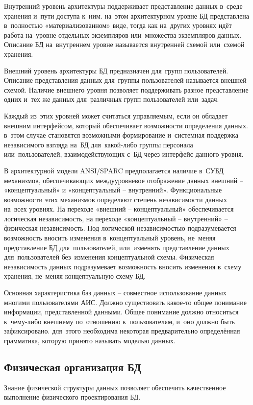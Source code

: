 \documentclass{ou}
\begin{document}
Внутренний уровень архитектуры поддерживает представление данных в~среде хранения и~пути доступа к~ним. на~этом архитектурном уровне БД представлена в~полностью «материализованном» виде, тогда как на~других уровнях идёт работа на~уровне отдельных экземпляров или~множества экземпляров данных. Описание БД на~внутреннем уровне называется внутренней схемой или~схемой хранения.

Внешний уровень архитектуры БД предназначен для~групп пользователей. Описание представления данных для~группы пользователей называется внешней схемой. Наличие внешнего уровня позволяет поддерживать разное представление одних и~тех же данных для~различных групп пользователей или~задач.

Каждый из~этих уровней может считаться управляемым, если он обладает внешним интерфейсом, который обеспечивает возможности определения данных. в~этом случае становятся возможными формирование и~системная поддержка независимого взгляда на~БД для~какой-либо группы персонала или~пользователей, взаимодействующих с~БД через интерфейс данного уровня.

В архитектурной модели ANSI/SPARC предполагается наличие в~СУБД механизмов, обеспечивающих междууровневое отображение данных внешний -- «концептуальный» и «концептуальный -- внутренний». Функциональные возможности этих механизмов определяют степень независимости данных на~всех уровнях. На переходе «внешний -- концептуальный» обеспечивается логическая независимость, на переходе «концептуальный -- внутренний» -- физическая независимость. Под логической независимостью подразумевается возможность вносить изменения в~концептуальный уровень, не~меняя представление БД для~пользователей, или~изменять представление данных для~пользователей без~изменения концептуальной схемы. Физическая независимость данных подразумевает возможность вносить изменения в~схему хранения, не~меняя концептуальную схему БД.

Основная характеристика баз данных -- совместное использование данных многими пользователями АИС. Должно существовать какое-то общее понимание информации, представленной данными. Общее понимание должно относиться к~чему-либо внешнему по~отношению к~пользователям, и~оно должно быть зафиксировано. для~этого необходима некоторая предварительно определённая грамматика, которую принято называть моделью данных.
\subsection{Физическая организация БД}
Знание физической структуры данных позволяет обеспечить качественное выполнение физического проектирования БД.
\end{document}
